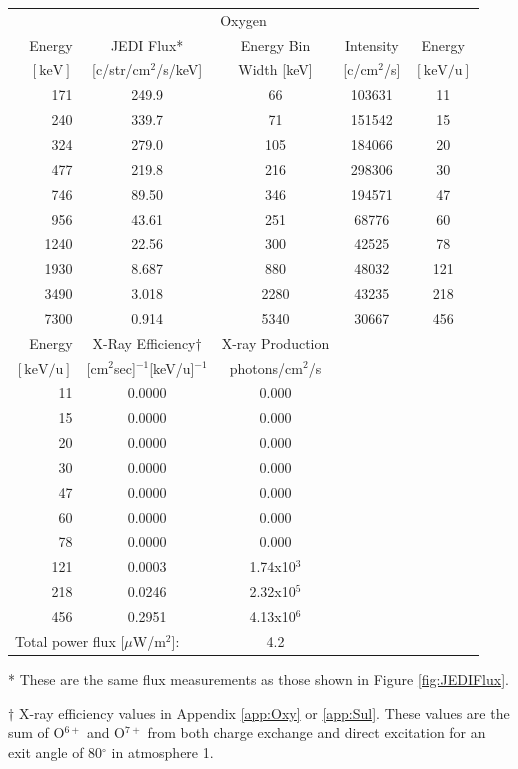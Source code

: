 \documentclass[draft]{agujournal2018}
\begin{document}
\begin{table}[ht]
    \centering
    \begin{tabular}{r|c|c|c|c}
    \multicolumn{5}{c}{Oxygen} \\ \cline{1-5}
    Energy & JEDI Flux* & Energy Bin & Intensity & Energy  \\
    $\mathrm{[keV]}$ & [c/str/cm$^2$/s/keV] & Width [keV] & [c/cm$^2$/s] & $\mathrm{[keV/u]}$ \\ \cline{1-5}
     171  & 249.9 &   66 & 103631 & 11  \\
     240  & 339.7 &   71 & 151542 & 15  \\
     324  & 279.0 &  105 & 184066 & 20  \\
     477  & 219.8 &  216 & 298306 & 30  \\
     746  & 89.50 &  346 & 194571 & 47  \\
     956  & 43.61 &  251 &  68776 & 60  \\
    1240  & 22.56 &  300 &  42525 & 78  \\
    1930  & 8.687 &  880 &  48032 & 121 \\
    3490  & 3.018 & 2280 &  43235 & 218 \\
    7300  & 0.914 & 5340 &  30667 & 456 \\ \cline{1-5}
    Energy  & X-Ray Efficiency$\dagger$ & X-ray Production \\
    $\mathrm{[keV/u]}$ & [cm$^2$sec]$^{-1}$[keV/u]$^{-1}$ & photons/cm$^2$/s \\ \cline{1-3}
    11    & 0.0000 & 0.000 \\
    15    & 0.0000 & 0.000 \\
    20    & 0.0000 & 0.000 \\
    30    & 0.0000 & 0.000 \\
    47    & 0.0000 & 0.000 \\
    60    & 0.0000 & 0.000 \\
    78    & 0.0000 & 0.000 \\
    121   & 0.0003 & 1.74x10$^{3}$  \\
    218   & 0.0246 & 2.32x10$^{5}$  \\
    456   & 0.2951 & 4.13x10$^{6}$ \\ \cline{1-3}
    \multicolumn{2}{l}{Total power flux [$\mu$W/m$^2$]:} & 4.2 \\ \cline{1-3}
    \end{tabular}
    \begin{flushleft}
    * These are the same flux measurements as those shown in Figure \ref{fig:JEDIFlux}.
    
    $\dagger$ X-ray efficiency values in Appendix \ref{app:Oxy} or \ref{app:Sul}. These values are the sum of O$^{6+}$ and O$^{7+}$ from both charge exchange and direct excitation for an exit angle of 80$^{\circ}$ in atmosphere 1.
    \end{flushleft}
    \label{tab:JEDIFlux}
\end{table}
\end{document}
